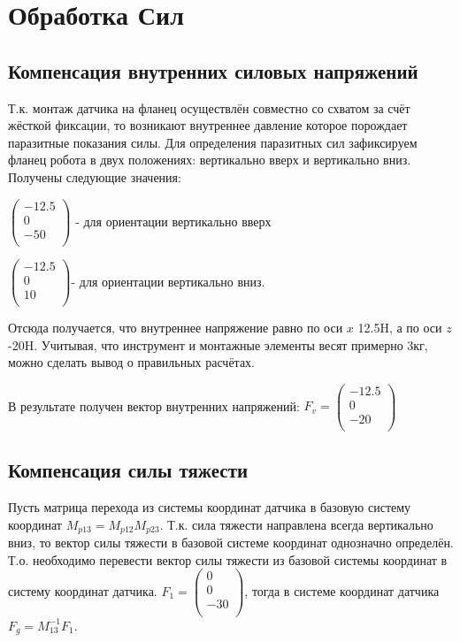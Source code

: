 \documentclass[a4paper,14pt,russian]{extreport} \usepackage{extsizes}
\begin{document}
		\section{Обработка Сил}
		\subsection{Компенсация внутренних силовых напряжений}
		Т.к. монтаж датчика на фланец осуществлён совместно со схватом за счёт жёсткой фиксации, то возникают внутреннее давление которое порождает паразитные показания силы. 
		Для определения паразитных сил зафиксируем фланец робота в двух положениях: вертикально вверх и вертикально вниз. Получены следующие значения: 
		
		$\begin{pmatrix}
		-12.5 \\ 0 \\ -50\\
		\end{pmatrix}$ - для ориентации вертикально вверх
		
		$\begin{pmatrix}
		-12.5 \\ 0 \\ 10\\
		\end{pmatrix} $- для ориентации  вертикально вниз.
		
		Отсюда получается, что внутреннее напряжение равно по оси $x$ 12.5H, а по оси $z$ -20H. Учитывая, что инструмент и монтажные элементы весят примерно 3кг, можно сделать вывод о правильных расчётах.
		
		В результате получен вектор внутренних напряжений: 
		$F_{v}=\begin{pmatrix}
		-12.5 \\ 0 \\ -20\\
		\end{pmatrix} $
		\subsection{Компенсация силы тяжести}
		Пусть матрица перехода из системы координат датчика в базовую систему координат ${M_{p13}}={M_{p12}}{M_{p23}}$.
		Т.к. сила тяжести направлена всегда вертикально вниз, то вектор силы тяжести в базовой системе координат однозначно определён. Т.о. необходимо перевести вектор силы тяжести из базовой системы координат в систему координат датчика. 
		$F_{1} = \begin{pmatrix}
		0 \\ 0 \\ -30\\
		\end{pmatrix}$, тогда в системе координат датчика $F_{g}=M_{13}^{-1} F_{1}$.
\end{document}
